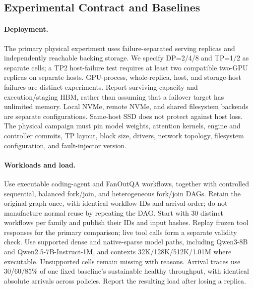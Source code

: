 \documentclass[sigplan,10pt,anonymous,nonacm]{acmart}
\begin{document}
\FloatBarrier
\subsection{Experimental Contract and Baselines}
\label{sec:eval-method}

\paragraph{Deployment.}
The primary physical experiment uses failure-separated serving replicas
and independently reachable backing storage. We specify DP=2/4/8 and TP=1/2
as separate cells; a TP2 host-failure test requires at least two compatible
two-GPU replicas on separate hosts. GPU-process, whole-replica, host, and
storage-host failures are distinct experiments. Report surviving capacity
and execution/staging HBM, rather than assuming that a failover target has
unlimited memory. Local NVMe, remote NVMe, and shared filesystem backends
are separate configurations. Same-host SSD does not protect against host
loss. The physical campaign must pin model weights, attention kernels,
engine and controller commits, TP layout, block size, drivers, network
topology, filesystem configuration, and fault-injector version.

\paragraph{Workloads and load.}
Use executable coding-agent and FanOutQA workflows, together with controlled
sequential, balanced fork/join, and heterogeneous fork/join DAGs. Retain
the original graph once, with identical workflow IDs and arrival order;
do not manufacture normal reuse by repeating the DAG. Start with 30
distinct workflows per family and publish their IDs and input hashes.
Replay frozen tool responses for the primary comparison; live tool calls
form a separate validity check. Use supported dense and native-sparse
model paths, including Qwen3-8B and Qwen2.5-7B-Instruct-1M, and contexts
32K/128K/512K/1.01M where executable. Unsupported cells remain missing
with reasons. Arrival traces use 30/60/85\% of one fixed baseline's
sustainable healthy throughput, with identical absolute arrivals across
policies. Report the resulting load after losing a replica.
\end{document}
